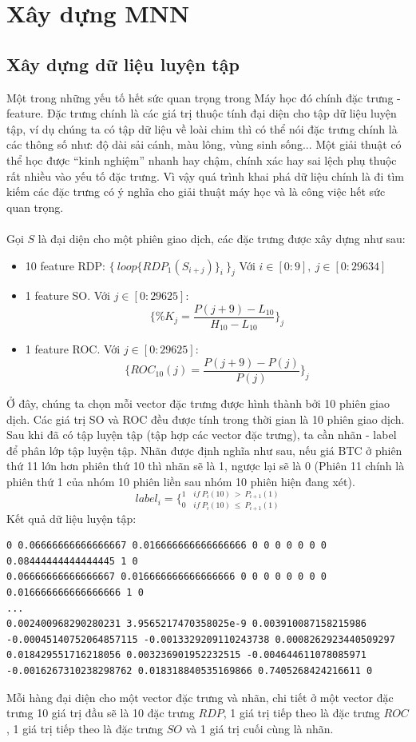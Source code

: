 \section{Xây dựng MNN}
\subsection{Xây dựng dữ liệu luyện tập}
Một trong những yếu tố hết sức quan trọng trong Máy học đó chính đặc trưng 
- feature. Đặc trưng chính là các giá trị thuộc tính đại diện cho tập dữ liệu 
luyện tập, ví dụ chúng ta có tập dữ liệu về loài chim thì có thể nói đặc trưng 
chính là các thông số như: độ dài sải cánh, màu lông, vùng sinh sống... Một 
giải thuật có thể học được ``kinh nghiệm'' nhanh hay chậm, chính xác hay sai lệch 
phụ thuộc rất nhiều vào yếu tố đặc trưng. Vì vậy quá trình khai phá dữ liệu 
chính là đi tìm kiếm các đặc trưng có ý nghĩa cho giải thuật máy học và là 
công việc hết sức quan trọng.\\\\
Gọi $S$ là đại diện cho một phiên giao dịch, các đặc trưng được xây dựng như 
sau:
\begin{itemize}
    \item 10 feature RDP: $\{ \: loop\{ RDP_1(S_{i+j})\}_i \: \}_j$ Với 
    $i \in [0:9], \: j \in [0:29634]$
    \item 1 feature SO. Với $ j \in [0:29625] $:\\
    \[
        \{ \%K_j = \frac{P(j+9)-L_{10}}{H_{10}-L_{10}} \}_j
    \]
    \item 1 feature ROC. Với $ j \in [0:29625] $:\\ 
    \[
        \{ ROC_{10}(j)= \frac{P(j+9) - P(j)}{P(j)} \}_j
    \]
\end{itemize}
Ở đây, chúng ta chọn mỗi vector đặc trưng được hình thành bởi 10 phiên giao 
dịch. Các giá trị SO và ROC đều được tính trong thời gian là 10 phiên giao dịch.
Sau khi đã có tập luyện tập (tập hợp các vector đặc trưng), ta cần nhãn - label 
để phân lớp tập luyện tập. Nhãn được định nghĩa như sau, nếu giá BTC ở phiên 
thứ 11 lớn hơn phiên thứ 10 thì nhãn sẽ là 1, ngược lại sẽ là 0 (Phiên 11 chính 
là phiên thứ 1 của nhóm 10 phiên liền sau nhóm 10 phiên hiện đang xét).\\
\[
    label_i = \bigg \{ _{0 \quad if \: P_i(10) \: \leq \: P_{i+1}(1)} ^{1 \quad if \: P_i(10) \: > \: P_{i+1}(1)}
\]
Kết quả dữ liệu luyện tập:
\begin{lstlisting}
0 0.06666666666666667 0.016666666666666666 0 0 0 0 0 0 0 0.08444444444444445 1 0
0.06666666666666667 0.016666666666666666 0 0 0 0 0 0 0 0 0.016666666666666666 1 0
...
0.002400968290280231 3.9565217470358025e-9 0.003910087158215986 -0.00045140752064857115 -0.0013329209110243738 0.0008262923440509297 0.018429551716218056 0.003236901952232515 -0.004644611078085971 -0.0016267310238298762 0.018318840535169866 0.7405268424216611 0
\end{lstlisting}
Mỗi hàng đại diện cho một vector đặc trưng và nhãn, chi tiết ở một vector đặc 
trưng 10 giá trị đầu sẽ là 10 đặc trưng $RDP$, 1 giá trị tiếp theo là đặc trưng 
$ROC$, 1 giá trị tiếp theo là đặc trưng $SO$ và 1 giá trị cuối cùng là nhãn.

